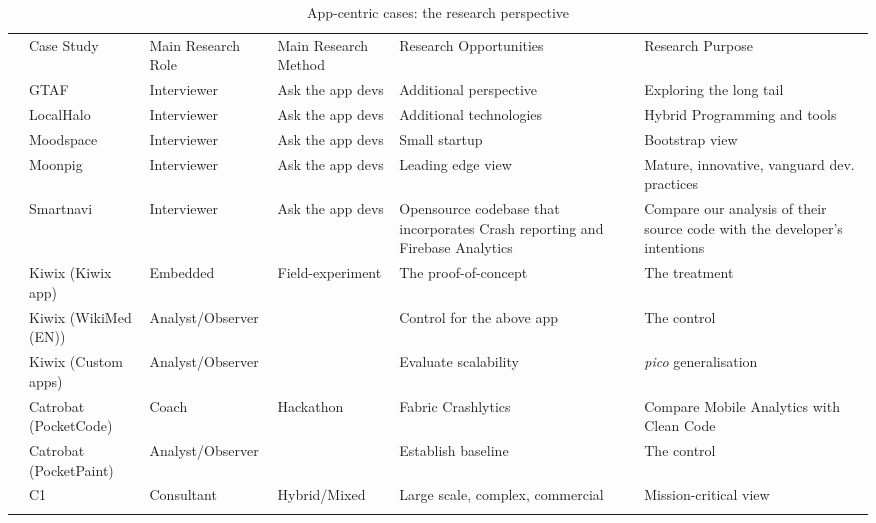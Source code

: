 \begin{table}
    \centering
    \footnotesize
    \begin{tabular}{clllp{3.3cm}p{3.3cm}}\toprule
    & Case Study                 & Main Research Role &  Main Research Method   & Research Opportunities             & Research Purpose \\
    \arrayrulecolor{blue!70}\midrule
    \multirow{4}{*}{\large {\rotatebox[origin=c]{90}{Interviews}}} & GTAF                       & Interviewer        & Ask the app devs & Additional perspective & Exploring the long tail \\
    & LocalHalo                  & Interviewer        & Ask the app devs & Additional technologies & Hybrid Programming and tools \\
    & Moodspace                  & Interviewer        & Ask the app devs & Small startup &Bootstrap view \\
    & Moonpig                    & Interviewer        & Ask the app devs & Leading edge view & Mature, innovative, vanguard dev. practices \\
    & Smartnavi                  & Interviewer        & Ask the app devs & Opensource codebase that incorporates Crash reporting and Firebase Analytics & Compare our analysis of their source code with the developer's intentions \\
    \arrayrulecolor{blue!70}\midrule
    \multirow{6}{*}{\large \rotatebox[origin=c]{90}{\parbox[c]{4cm}{\centering Interventions}}} & Kiwix (Kiwix app)          & Embedded           & Field-experiment   & The proof-of-concept      & The treatment \\ 
    & Kiwix (WikiMed (EN))       & Analyst/Observer   &                    & Control for the above app & The control  \\
    & Kiwix (Custom apps)        & Analyst/Observer   &                    & Evaluate scalability      & \textit{pico} generalisation \\
    \arrayrulecolor{blue!20}\midrule
    & Catrobat (PocketCode)      & Coach              & Hackathon   & Fabric Crashlytics        & Compare Mobile Analytics with Clean Code \\
    & Catrobat (PocketPaint)     & Analyst/Observer   &                    & Establish baseline        & The control  \\
     \midrule
    & C1                         & Consultant         & Hybrid/Mixed & Large scale, complex, commercial & Mission-critical view \\
    \arrayrulecolor{black}\bottomrule
    \end{tabular}
    \caption{App-centric cases: the research perspective}
    \label{tab:app-centric-studies-research-perspective}
\end{table}

